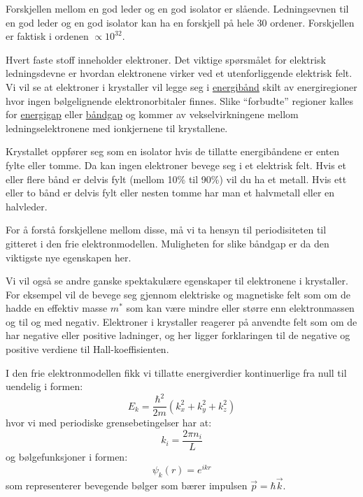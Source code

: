 \documentclass{article}
\begin{document}
Forskjellen mellom en god leder og en god isolator er slående. Ledningsevnen til en god leder og en god isolator kan ha en forskjell på hele 30 ordener. Forskjellen er faktisk i ordenen $\propto 10^{32}$.

Hvert faste stoff inneholder elektroner. Det viktige spørsmålet for elektrisk ledningsdevne er hvordan elektronene virker ved et utenforliggende elektrisk felt. Vi vil se at elektroner i krystaller vil legge seg i \underline{energibånd} skilt av energiregioner hvor ingen bølgelignende elektronorbitaler finnes. Slike \enquote{forbudte} regioner kalles for \underline{energigap} eller \underline{båndgap} og kommer av vekselvirkningene mellom ledningselektronene med ionkjernene til krystallene.

Krystallet oppfører seg som en isolator hvis de tillatte energibåndene er enten fylte eller tomme. Da kan ingen elektroner bevege seg i et elektrisk felt. Hvis et eller flere bånd er delvis fylt (mellom 10\% til 90\%) vil du ha et metall. Hvis ett eller to bånd er delvis fylt eller nesten tomme har man et halvmetall eller en halvleder.

For å forstå forskjellene mellom disse, må vi ta hensyn til periodisiteten til gitteret i den frie elektronmodellen. Muligheten for slike båndgap er da den viktigste nye egenskapen her.

Vi vil også se andre ganske spektakulære egenskaper til elektronene i krystaller. For eksempel vil de bevege seg gjennom elektriske og magnetiske felt som om de hadde en effektiv masse $m^{*}$ som kan være mindre eller større enn elektronmassen og til og med negativ. Elektroner i krystaller reagerer på anvendte felt som om de har negative eller positive ladninger, og her ligger forklaringen til de negative og positive verdiene til Hall-koeffisienten.

I den frie elektronmodellen fikk vi tillatte energiverdier kontinuerlige fra null til uendelig i formen:
\begin{equation}
    E_k = \frac{\hbar^2}{2m} \left(k_x^2 + k_y^2 + k_z^2\right)
\end{equation}
hvor vi med periodiske grensebetingelser har at:
\begin{equation}
    k_i = \frac{2 \pi n_i}{L}
\end{equation}
og bølgefunksjoner i formen:
\begin{equation}
    \psi_k(r) = e^{ikr}
\end{equation}
som representerer bevegende bølger som bærer impulsen $\vec{p} = \hbar \vec{k}$.
\end{document}
